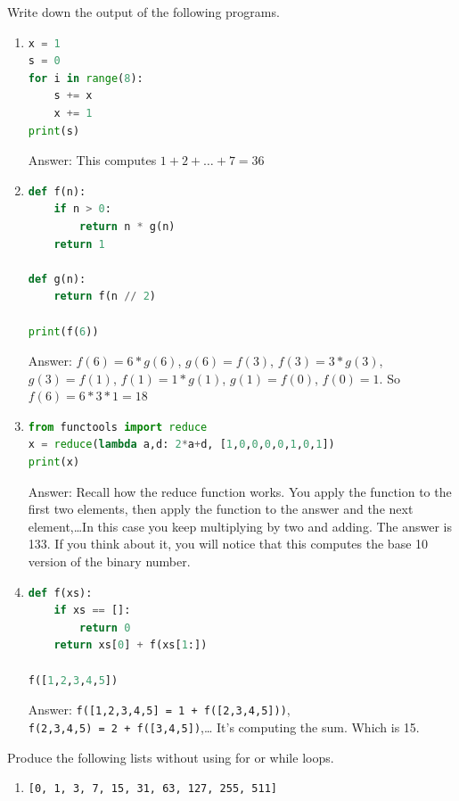 \documentclass[addpoints,12pt]{exam}
\newcommand{\code}[1]{{\texttt{#1}}}
\begin{document}
\begin{questions}

\question[20]
Write down the output of the following programs.

\begin{enumerate}
\item 
\begin{lstlisting}[language=python]
x = 1
s = 0
for i in range(8):
    s += x
    x += 1
print(s)
\end{lstlisting}
\vfill
Answer: This computes $1+2+\dots+7 = 36$
\vfill


\item 
\begin{lstlisting}[language=python]
def f(n):
    if n > 0:
        return n * g(n)
    return 1

def g(n):
    return f(n // 2)

print(f(6))
\end{lstlisting}
\vfill
Answer: $f(6) = 6 * g(6)$, $g(6) = f(3)$, $f(3) = 3 * g(3)$, $g(3) = f(1)$, $f(1) = 1*g(1)$, $g(1) = f(0)$, $f(0) = 1$. So $f(6) = 6*3*1 = 18$
\vfill

\item 
\begin{lstlisting}[language=python]
from functools import reduce
x = reduce(lambda a,d: 2*a+d, [1,0,0,0,0,1,0,1])
print(x)
\end{lstlisting}
\vfill
Answer: Recall how the reduce function works. You apply the function to the first two elements, then apply the function to the answer and the next element,\dots In this case you keep multiplying by two and adding. The answer is 133. 
If you think about it, you will notice that this computes the base 10 version of the binary number.
\vfill

\item 
\begin{lstlisting}[language=python]
def f(xs):
    if xs == []:
        return 0
    return xs[0] + f(xs[1:])

f([1,2,3,4,5])
\end{lstlisting}
\vfill
Answer: \code{f([1,2,3,4,5] = 1 + f([2,3,4,5]))}, 
\\\code{f(2,3,4,5) = 2 + f([3,4,5])},\dots
It's computing the sum. Which is 15.
\vfill


\end{enumerate}

\newpage
\question[20] Produce the following lists without using for or while loops. 
\begin{enumerate}
  \item \code{[0, 1, 3, 7, 15, 31, 63, 127, 255, 511]}
    

\end{enumerate}
\end{questions}
\end{document}
